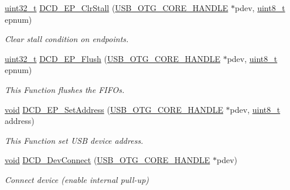 \begin{DoxyCompactItemize}
\hyperlink{stdint_8h_a435d1572bf3f880d55459d9805097f62}{uint32\-\_\-t} \hyperlink{group___u_s_b___d_c_d___private___functions_gabdb4ba47ac9d83d0690d425bb616d83d}{D\-C\-D\-\_\-\-E\-P\-\_\-\-Clr\-Stall} (\hyperlink{group___u_s_b___c_o_r_e___exported___types_gaf76054c11eb8a3367907aad7ae700e80}{U\-S\-B\-\_\-\-O\-T\-G\-\_\-\-C\-O\-R\-E\-\_\-\-H\-A\-N\-D\-L\-E} $\ast$pdev, \hyperlink{stdint_8h_aba7bc1797add20fe3efdf37ced1182c5}{uint8\-\_\-t} epnum)
\begin{DoxyCompactList}\small\item\em Clear stall condition on endpoints. \end{DoxyCompactList}\item 
\hyperlink{stdint_8h_a435d1572bf3f880d55459d9805097f62}{uint32\-\_\-t} \hyperlink{group___u_s_b___d_c_d___private___functions_ga60384fbc64829d957de52fe32a9a70a8}{D\-C\-D\-\_\-\-E\-P\-\_\-\-Flush} (\hyperlink{group___u_s_b___c_o_r_e___exported___types_gaf76054c11eb8a3367907aad7ae700e80}{U\-S\-B\-\_\-\-O\-T\-G\-\_\-\-C\-O\-R\-E\-\_\-\-H\-A\-N\-D\-L\-E} $\ast$pdev, \hyperlink{stdint_8h_aba7bc1797add20fe3efdf37ced1182c5}{uint8\-\_\-t} epnum)
\begin{DoxyCompactList}\small\item\em This Function flushes the F\-I\-F\-Os. \end{DoxyCompactList}\item 
\hyperlink{group___n_a_m_e_ga18028b8badbf1ea7e704ccac3c488e82}{void} \hyperlink{group___u_s_b___d_c_d___private___functions_ga14cab44ffb4094334bb0292ea81c9a5a}{D\-C\-D\-\_\-\-E\-P\-\_\-\-Set\-Address} (\hyperlink{group___u_s_b___c_o_r_e___exported___types_gaf76054c11eb8a3367907aad7ae700e80}{U\-S\-B\-\_\-\-O\-T\-G\-\_\-\-C\-O\-R\-E\-\_\-\-H\-A\-N\-D\-L\-E} $\ast$pdev, \hyperlink{stdint_8h_aba7bc1797add20fe3efdf37ced1182c5}{uint8\-\_\-t} address)
\begin{DoxyCompactList}\small\item\em This Function set U\-S\-B device address. \end{DoxyCompactList}\item 
\hyperlink{group___n_a_m_e_ga18028b8badbf1ea7e704ccac3c488e82}{void} \hyperlink{group___u_s_b___d_c_d___private___functions_gae86236f273ed0499af2ab44915ff3983}{D\-C\-D\-\_\-\-Dev\-Connect} (\hyperlink{group___u_s_b___c_o_r_e___exported___types_gaf76054c11eb8a3367907aad7ae700e80}{U\-S\-B\-\_\-\-O\-T\-G\-\_\-\-C\-O\-R\-E\-\_\-\-H\-A\-N\-D\-L\-E} $\ast$pdev)
\begin{DoxyCompactList}\small\item\em Connect device (enable internal pull-\/up) \end{DoxyCompactList}\item 

\end{DoxyCompactItemize}
